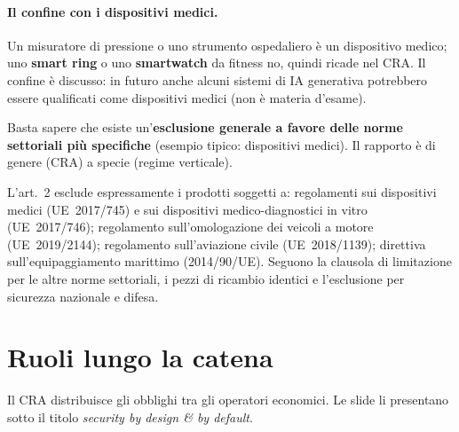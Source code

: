 \paragraph{Il confine con i dispositivi medici.} Un misuratore di pressione o uno strumento ospedaliero
è un dispositivo medico; uno \textbf{smart ring} o uno \textbf{smartwatch} da fitness no, quindi ricade
nel CRA. Il confine è discusso: in futuro anche alcuni sistemi di IA generativa potrebbero essere
qualificati come dispositivi medici (non è materia d'esame).

\begin{esame}
Basta sapere che esiste un'\textbf{esclusione generale a favore delle norme settoriali più specifiche}
(esempio tipico: dispositivi medici). Il rapporto è di genere (CRA) a specie (regime verticale).
\end{esame}

\begin{integrazione}
L'art.~2 esclude espressamente i prodotti soggetti a: regolamenti sui dispositivi medici (UE~2017/745) e
sui dispositivi medico-diagnostici in vitro (UE~2017/746); regolamento sull'omologazione dei veicoli a
motore (UE~2019/2144); regolamento sull'aviazione civile (UE~2018/1139); direttiva sull'equipaggiamento
marittimo (2014/90/UE). Seguono la clausola di limitazione per le altre norme settoriali, i pezzi di
ricambio identici e l'esclusione per sicurezza nazionale e difesa.
\end{integrazione}

\section{Ruoli lungo la catena}
\label{sec:cra-ruoli}

Il CRA distribuisce gli obblighi tra gli operatori economici. Le slide li presentano sotto il titolo
\emph{security by design \& by default}.

